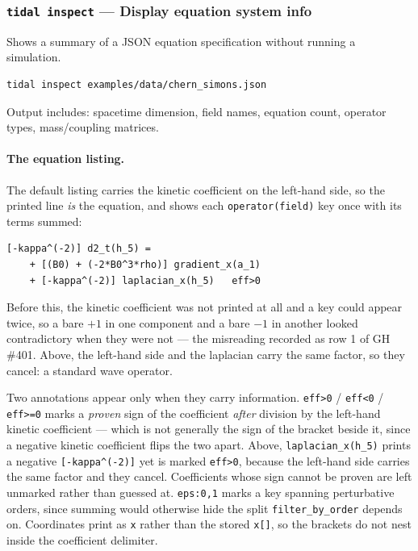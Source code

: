 \subsubsection{\texttt{tidal inspect} --- Display equation system info}

Shows a summary of a JSON equation specification without running a simulation.

\begin{lstlisting}[style=bash]
tidal inspect examples/data/chern_simons.json
\end{lstlisting}

Output includes: spacetime dimension, field names, equation count, operator types, mass/coupling matrices.

\paragraph{The equation listing.}
The default listing carries the kinetic coefficient on the left-hand side, so the
printed line \emph{is} the equation, and shows each \texttt{operator(field)} key once
with its terms summed:

\begin{lstlisting}[style=bash]
[-kappa^(-2)] d2_t(h_5) =
    + [(B0) + (-2*B0^3*rho)] gradient_x(a_1)
    + [-kappa^(-2)] laplacian_x(h_5)   eff>0
\end{lstlisting}

Before this, the kinetic coefficient was not printed at all and a key could appear
twice, so a bare $+1$ in one component and a bare $-1$ in another looked contradictory
when they were not --- the misreading recorded as row 1 of GH \#401. Above, the
left-hand side and the laplacian carry the same factor, so they cancel: a standard wave
operator.

Two annotations appear only when they carry information. \texttt{eff>0} /
\texttt{eff<0} / \texttt{eff>=0} marks a \emph{proven} sign of the coefficient
\emph{after} division by the left-hand kinetic coefficient --- which is not generally
the sign of the bracket beside it, since a negative kinetic coefficient flips the two
apart. Above, \texttt{laplacian\_x(h\_5)} prints a negative \texttt{[-kappa\^{}(-2)]}
yet is marked \texttt{eff>0}, because the left-hand side carries the same factor and
they cancel. Coefficients whose sign cannot be proven are left unmarked rather than
guessed at. \texttt{eps:0,1} marks a key spanning perturbative
orders, since summing would otherwise hide the split \texttt{filter\_by\_order} depends
on. Coordinates print as \texttt{x} rather than the stored \texttt{x[]}, so the brackets
do not nest inside the coefficient delimiter.

